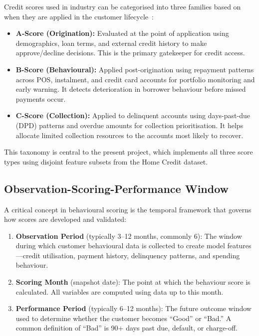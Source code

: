 Credit scores used in industry can be categorised into three families based on when they are applied in the customer lifecycle~\cite{siddiqi2012}:

\begin{itemize}
    \item \textbf{A-Score (Origination):} Evaluated at the point of application using demographics, loan terms, and external credit history to make approve/decline decisions. This is the primary gatekeeper for credit access.
    \item \textbf{B-Score (Behavioural):} Applied post-origination using repayment patterns across POS, instalment, and credit card accounts for portfolio monitoring and early warning. It detects deterioration in borrower behaviour before missed payments occur.
    \item \textbf{C-Score (Collection):} Applied to delinquent accounts using days-past-due (DPD) patterns and overdue amounts for collection prioritisation. It helps allocate limited collection resources to the accounts most likely to recover.
\end{itemize}

This taxonomy is central to the present project, which implements all three score types using disjoint feature subsets from the Home Credit dataset.

\subsection{Observation-Scoring-Performance Window}

A critical concept in behavioural scoring is the temporal framework that governs how scores are developed and validated:

\begin{enumerate}
    \item \textbf{Observation Period} (typically 3--12 months, commonly 6): The window during which customer behavioural data is collected to create model features---credit utilisation, payment history, delinquency patterns, and spending behaviour.
    \item \textbf{Scoring Month} (snapshot date): The point at which the behaviour score is calculated. All variables are computed using data up to this month.
    \item \textbf{Performance Period} (typically 6--12 months): The future outcome window used to determine whether the customer becomes ``Good'' or ``Bad.'' A common definition of ``Bad'' is 90+ days past due, default, or charge-off.
\end{enumerate}

